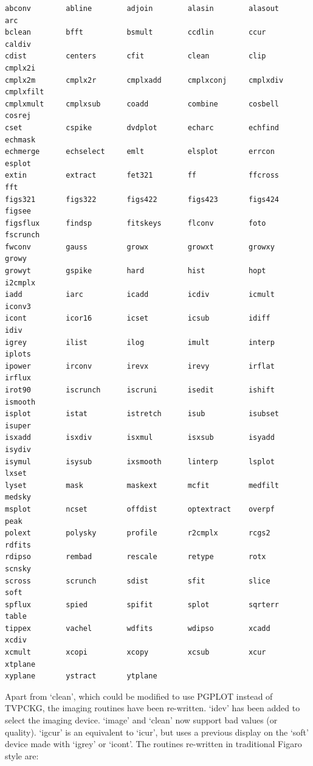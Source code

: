 \begin{verbatim}
abconv        abline        adjoin        alasin        alasout       arc
bclean        bfft          bsmult        ccdlin        ccur          caldiv
cdist         centers       cfit          clean         clip          cmplx2i
cmplx2m       cmplx2r       cmplxadd      cmplxconj     cmplxdiv      cmplxfilt
cmplxmult     cmplxsub      coadd         combine       cosbell       cosrej
cset          cspike        dvdplot       echarc        echfind       echmask
echmerge      echselect     emlt          elsplot       errcon        esplot
extin         extract       fet321        ff            ffcross       fft
figs321       figs322       figs422       figs423       figs424       figsee
figsflux      findsp        fitskeys      flconv        foto          fscrunch
fwconv        gauss         growx         growxt        growxy        growy
growyt        gspike        hard          hist          hopt          i2cmplx
iadd          iarc          icadd         icdiv         icmult        iconv3
icont         icor16        icset         icsub         idiff         idiv
igrey         ilist         ilog          imult         interp        iplots
ipower        irconv        irevx         irevy         irflat        irflux
irot90        iscrunch      iscruni       isedit        ishift        ismooth
isplot        istat         istretch      isub          isubset       isuper
isxadd        isxdiv        isxmul        isxsub        isyadd        isydiv
isymul        isysub        ixsmooth      linterp       lsplot        lxset
lyset         mask          maskext       mcfit         medfilt       medsky
msplot        ncset         offdist       optextract    overpf        peak
polext        polysky       profile       r2cmplx       rcgs2         rdfits
rdipso        rembad        rescale       retype        rotx          scnsky
scross        scrunch       sdist         sfit          slice         soft
spflux        spied         spifit        splot         sqrterr       table
tippex        vachel        wdfits        wdipso        xcadd         xcdiv
xcmult        xcopi         xcopy         xcsub         xcur          xtplane
xyplane       ystract       ytplane
\end{verbatim}

   Apart from `clean', which could be modified to use PGPLOT instead of
   TVPCKG, the imaging routines have been re-written.  `idev' has been
   added to select the imaging device.  `image' and `clean' now support
   bad values (or quality).  `igcur' is an equivalent to `icur', but
   uses a previous display on the `soft' device made with `igrey' or
   `icont'.  The routines re-written in traditional Figaro style are:

